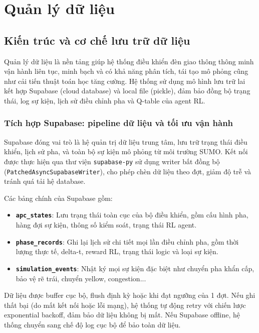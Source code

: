 \chapter{Quản lý dữ liệu}

\section{Kiến trúc và cơ chế lưu trữ dữ liệu}

Quản lý dữ liệu là nền tảng giúp hệ thống điều khiển đèn giao thông thông minh vận hành liên tục, minh bạch và có khả năng phân tích, tái tạo mô phỏng cũng như cải tiến thuật toán học tăng cường. Hệ thống sử dụng mô hình lưu trữ lai kết hợp Supabase (cloud database) và local file (pickle), đảm bảo đồng bộ trạng thái, log sự kiện, lịch sử điều chỉnh pha và Q-table của agent RL.

\subsection{Tích hợp Supabase: pipeline dữ liệu và tối ưu vận hành}

Supabase đóng vai trò là hệ quản trị dữ liệu trung tâm, lưu trữ trạng thái điều khiển, lịch sử pha, và toàn bộ sự kiện mô phỏng từ môi trường SUMO. Kết nối được thực hiện qua thư viện \texttt{supabase-py} sử dụng writer bất đồng bộ (\texttt{PatchedAsyncSupabaseWriter}), cho phép chèn dữ liệu theo đợt, giảm độ trễ và tránh quá tải hệ database.

Các bảng chính của Supabase gồm:
\begin{itemize}
    \item \textbf{\texttt{apc\_states}}: Lưu trạng thái toàn cục của bộ điều khiển, gồm cấu hình pha, hàng đợi sự kiện, thông số kiểm soát, trạng thái RL agent.
    \item \textbf{\texttt{phase\_records}}: Ghi lại lịch sử chi tiết mọi lần điều chỉnh pha, gồm thời lượng thực tế, delta-t, reward RL, trạng thái logic và loại sự kiện.
    \item \textbf{\texttt{simulation\_events}}: Nhật ký mọi sự kiện đặc biệt như chuyển pha khẩn cấp, bảo vệ rẽ trái, chuyển yellow, congestion...
\end{itemize}

Dữ liệu được buffer cục bộ, flush định kỳ hoặc khi đạt ngưỡng của 1 đợt. Nếu ghi thất bại (do mất kết nối hoặc lỗi mạng), hệ thống tự động retry với chiến lược exponential backoff, đảm bảo dữ liệu không bị mất. Nếu Supabase offline, hệ thống chuyển sang chế độ log cục bộ để bảo toàn dữ liệu.

